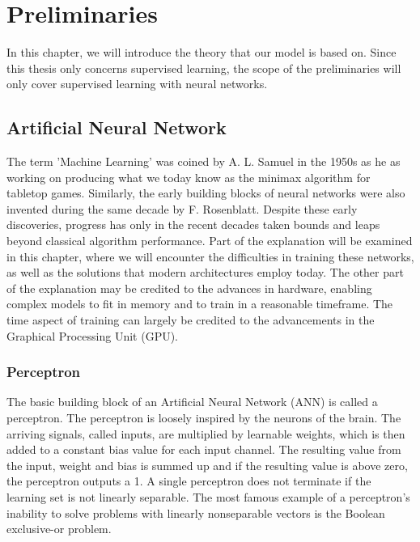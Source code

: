 \documentclass[english, bibtex]{kththesis}
\begin{document}
\cleardoublepage
\chapter{Preliminaries}
\label{ch:preliminaries}

In this chapter, we will introduce the theory that our model is based on. Since this thesis only concerns supervised learning, the scope of the preliminaries will only cover supervised learning with neural networks.

\section{Artificial Neural Network}

The term 'Machine Learning' was coined by A. L. Samuel\cite{samuela1959} in the 1950s as he as working on producing what we today know as the minimax algorithm for tabletop games. Similarly, the early building blocks of neural networks were also invented during the same decade by F. Rosenblatt\cite{rosenblatt1958perceptron}. Despite these early discoveries, progress has only in the recent decades taken bounds and leaps beyond classical algorithm performance. Part of the explanation will be examined in this chapter, where we will encounter the difficulties in training these networks, as well as the solutions that modern architectures employ today. The other part of the explanation may be credited to the advances in hardware, enabling complex models to fit in memory and to train in a reasonable timeframe. The time aspect of training can largely be credited to the advancements in the Graphical Processing Unit (GPU).    

\subsection{Perceptron}
The basic building block of an Artificial Neural Network (ANN) is called a perceptron. The perceptron is loosely inspired by the neurons of the brain\cite{rosenblatt1958perceptron}. The arriving signals, called inputs, are multiplied by learnable weights, which is then added to a constant bias value for each input channel. The resulting value from the input, weight and bias is summed up and if the resulting value is above zero, the perceptron outputs a 1. A single perceptron does not terminate if the learning set is not linearly separable. The most famous example of a perceptron's inability to solve problems with linearly nonseparable vectors is the Boolean exclusive-or problem.
\end{document}
